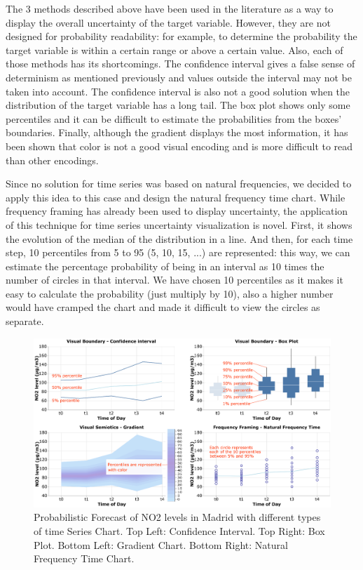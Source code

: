 \documentclass[a4paper,3p,sort&compress]{elsarticle}
\begin{document}
The 3 methods described above have been used in the literature as a way to display the overall uncertainty
of the target variable. However, they are not designed for probability readability: for example, to determine
the probability the target variable is within a certain range or above a certain value. Also,
each of those methods has its shortcomings. The confidence interval gives a false sense of determinism as mentioned previously
and values outside the interval may not be taken into account. The confidence interval is also not a good solution
when the distribution of the target variable has a long tail. The box plot shows only some percentiles and it can be difficult to
estimate the probabilities from the boxes' boundaries. Finally, although the gradient displays the most information, it has been
shown \cite{cleveland_graphical_1984} that color is not
a good visual encoding and is more difficult to read than other encodings.

Since no solution for time series was based on natural frequencies, we decided to apply this idea to this case
and design the natural frequency time chart.
While frequency framing has already been used to display uncertainty, the application of this technique for time series
uncertainty visualization is novel. First,
it shows the evolution of the median of the distribution in a line. And then, for each time
step, 10 percentiles from 5 to 95 (5, 10, 15, ...) are represented: this way, we can estimate the percentage
probability of being in an interval as 10 times the number of circles in that interval.
We have chosen 10 percentiles as it makes it easy to calculate the probability (just multiply by 10), also a higher number
would have cramped the chart and made it difficult to view the circles as separate.

\begin{figure}
  \centering
  \includegraphics[width=.9\textwidth]{charts_vector}
  \caption{\label{figure:charts} Probabilistic Forecast of NO2 levels in Madrid with different types of time Series Chart.
  Top Left: Confidence Interval. Top Right: Box Plot.
  Bottom Left: Gradient Chart. Bottom Right: Natural Frequency Time Chart. }
\end{figure}
\end{document}
